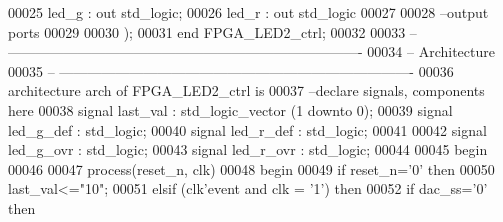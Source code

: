 \begin{DoxyCode}
00025           \textcolor{vhdlchar}{led_g}         \textcolor{vhdlchar}{:} \textcolor{keywordflow}{out} \textcolor{comment}{std\_logic};
00026           \textcolor{vhdlchar}{led_r}         \textcolor{vhdlchar}{:} \textcolor{keywordflow}{out} \textcolor{comment}{std\_logic}
00027 
00028 \textcolor{keyword}{        --output ports }
00029         
00030         \textcolor{vhdlchar}{)};
00031 \textcolor{keywordflow}{end} \textcolor{vhdlchar}{FPGA\_LED2\_ctrl};
00032 
00033 \textcolor{keyword}{-- ----------------------------------------------------------------------------}
00034 \textcolor{keyword}{-- Architecture}
00035 \textcolor{keyword}{-- ----------------------------------------------------------------------------}
00036 \textcolor{keywordflow}{architecture} arch \textcolor{keywordflow}{of} FPGA_LED2_ctrl is
00037 \textcolor{keyword}{--declare signals,  components here}
00038 \textcolor{keywordflow}{signal} \textcolor{vhdlchar}{last_val} \textcolor{vhdlchar}{:} \textcolor{comment}{std\_logic\_vector} \textcolor{vhdlchar}{(}\textcolor{vhdllogic}{}\textcolor{vhdllogic}{1} \textcolor{keywordflow}{downto} \textcolor{vhdllogic}{}\textcolor{vhdllogic}{0}\textcolor{vhdlchar}{)};
00039 \textcolor{keywordflow}{signal} \textcolor{vhdlchar}{led_g_def}    \textcolor{vhdlchar}{:} \textcolor{comment}{std\_logic};
00040 \textcolor{keywordflow}{signal} \textcolor{vhdlchar}{led_r_def}    \textcolor{vhdlchar}{:} \textcolor{comment}{std\_logic};
00041 
00042 \textcolor{keywordflow}{signal} \textcolor{vhdlchar}{led_g_ovr}    \textcolor{vhdlchar}{:} \textcolor{comment}{std\_logic};
00043 \textcolor{keywordflow}{signal} \textcolor{vhdlchar}{led_r_ovr}    \textcolor{vhdlchar}{:} \textcolor{comment}{std\_logic};
00044 
00045 \textcolor{vhdlkeyword}{begin}
00046 
00047   \textcolor{keywordflow}{process}(reset_n, clk)
00048 \textcolor{vhdlkeyword}{    begin}
00049       \textcolor{keywordflow}{if} \textcolor{vhdlchar}{reset_n}\textcolor{vhdlchar}{=}\textcolor{vhdlchar}{'}\textcolor{vhdllogic}{}\textcolor{vhdllogic}{0}\textcolor{vhdlchar}{'} \textcolor{keywordflow}{then}
00050         \textcolor{vhdlchar}{last_val}\textcolor{vhdlchar}{<=}\textcolor{vhdllogic}{"10"}; 
00051         \textcolor{keywordflow}{elsif} \textcolor{vhdlchar}{(}\textcolor{vhdlchar}{clk}\textcolor{vhdlchar}{'}\textcolor{vhdlkeyword}{event} \textcolor{keywordflow}{and} \textcolor{vhdlchar}{clk} \textcolor{vhdlchar}{=} \textcolor{vhdlchar}{'}\textcolor{vhdllogic}{}\textcolor{vhdllogic}{1}\textcolor{vhdlchar}{'}\textcolor{vhdlchar}{)} \textcolor{keywordflow}{then}
00052           \textcolor{keywordflow}{if} \textcolor{vhdlchar}{dac_ss}\textcolor{vhdlchar}{=}\textcolor{vhdlchar}{'}\textcolor{vhdllogic}{}\textcolor{vhdllogic}{0}\textcolor{vhdlchar}{'} \textcolor{keywordflow}{then} 

\end{DoxyCode}
